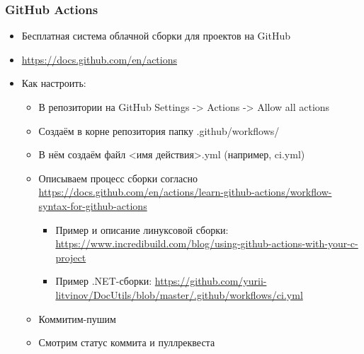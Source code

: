 \documentclass[xetex,mathserif,serif]{beamer}
\begin{document}
    \begin{frame}
        \frametitle{GitHub Actions}
        \begin{itemize}
            \item Бесплатная система облачной сборки для проектов на GitHub
            \item \url{https://docs.github.com/en/actions}
            \item Как настроить:
            \begin{itemize}
                \item В репозитории на GitHub Settings -> Actions -> Allow all actions
                \item Создаём в корне репозитория папку .github/workflows/
                \item В нём создаём файл <имя действия>.yml (например, ci.yml)
                \item Описываем процесс сборки согласно \url{https://docs.github.com/en/actions/learn-github-actions/workflow-syntax-for-github-actions}
                \begin{itemize}
                    \item Пример и описание линуксовой сборки: \url{https://www.incredibuild.com/blog/using-github-actions-with-your-c-project}
                    \item Пример .NET-сборки: \url{https://github.com/yurii-litvinov/DocUtils/blob/master/.github/workflows/ci.yml}
                \end{itemize}
                \item Коммитим-пушим
                \item Смотрим статус коммита и пуллреквеста
            \end{itemize}
        \end{itemize}
    \end{frame}
\end{document}
